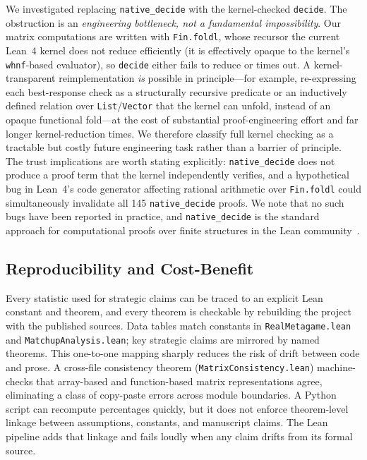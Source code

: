\documentclass[journal]{IEEEtran}
\newif\ifhighlightchanges
\newcommand{\revised}[1]{\ifhighlightchanges\textcolor{blue!70!black}{#1}\else#1\fi}
\let\origsubsection\subsection
\renewcommand{\subsection}{\needspace{3\baselineskip}\origsubsection}
\begin{document}
\revised{We investigated replacing \texttt{native\_decide} with the kernel-checked \texttt{decide}.
The obstruction is an \emph{engineering bottleneck, not a fundamental impossibility}.
Our matrix computations are written with \texttt{Fin.foldl}, whose recursor the current Lean~4 kernel does not reduce efficiently (it is effectively opaque to the kernel's \texttt{whnf}-based evaluator), so \texttt{decide} either fails to reduce or times out.
A kernel-transparent reimplementation \emph{is} possible in principle---for example, re-expressing each best-response check as a structurally recursive predicate or an inductively defined relation over \texttt{List}/\texttt{Vector} that the kernel can unfold, instead of an opaque functional fold---at the cost of substantial proof-engineering effort and far longer kernel-reduction times.
We therefore classify full kernel checking as a tractable but costly future engineering task rather than a barrier of principle.}
The trust implications are worth stating explicitly: \texttt{native\_decide} does not produce a proof term that the kernel independently verifies, and a hypothetical bug in Lean~4's code generator affecting rational arithmetic over \texttt{Fin.foldl} could simultaneously invalidate all 145 \texttt{native\_decide} proofs.
We note that no such bugs have been reported in practice, and \texttt{native\_decide} is the standard approach for computational proofs over finite structures in the Lean community~\cite{moura2021lean}.

\subsection{Reproducibility and Cost-Benefit}

Every statistic used for strategic claims can be traced to an explicit Lean constant and theorem, and every theorem is checkable by rebuilding the project with the published sources.
Data tables match constants in \texttt{RealMetagame.lean} and \texttt{MatchupAnalysis.lean}; key strategic claims are mirrored by named theorems.
This one-to-one mapping sharply reduces the risk of drift between code and prose.
A cross-file consistency theorem (\texttt{MatrixConsistency.lean}) machine-checks that array-based and function-based matrix representations agree, eliminating a class of copy-paste errors across module boundaries.
A Python script can recompute percentages quickly, but it does not enforce theorem-level linkage between assumptions, constants, and manuscript claims.
The Lean pipeline adds that linkage and fails loudly when any claim drifts from its formal source.
\end{document}
